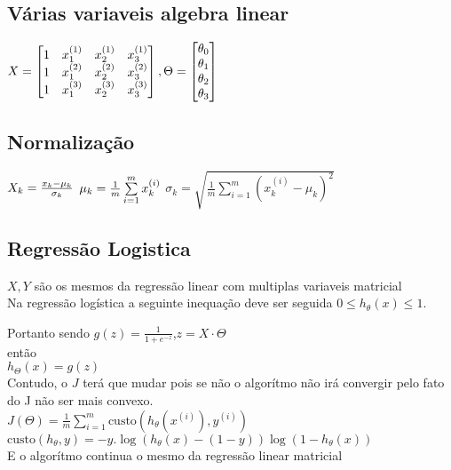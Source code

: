 \documentclass{article}
\begin{document}
	\subsection{Várias variaveis algebra linear}
	$
	X=\begin{bmatrix}
	1 & x^{(1)}_1 & x^{(1)}_2 & x^{(1)}_3 \\
	1 & x^{(2)}_1 & x^{(2)}_2 & x^{(2)}_3 \\
	1 & x^{(3)}_1 & x^{(3)}_2 & x^{(3)}_3 \\
	\end{bmatrix},
	\Theta=\begin{bmatrix}
	\theta_0 \\
	\theta_1 \\
	\theta_2 \\
	\theta_3
	\end{bmatrix}\\
	$

	\subsection{Normalização}
	
	$X_k=\frac{x_k-\mu_k}{\sigma_k}\\$
	$\mu_k=\frac{1}{m}\sum\limits_{i=1}^{m}x_k^{(i)}\\$
	$\sigma_k=\sqrt{\frac{1}{m}\sum\limits_{i=1}^{m}(x_k^{(i)}-\mu_k)^2}$

	\subsection{Regressão Logistica}
	$X,Y$ são os mesmos da regressão linear com multiplas variaveis matricial \\
	Na regressão logística a seguinte inequação deve ser seguida $0 \leq h_\theta(x) \leq 1$.

	Portanto sendo $g(z)=\frac{1}{1+e^{-z}}$,$z=X\cdot\Theta$\\
	então\\
	$h_\Theta(x)=g(z)$ \\
	Contudo, o $J$ terá que mudar pois se não o algorítmo não irá convergir pelo fato do J não 
	ser mais convexo.\\

	$J(\Theta)=\frac{1}{m}\sum\limits_{i=1}^{m}\text{custo}(h_\theta(x^{(i)}),y^{(i)})$ \\
	$\text{custo}(h_{\theta},y)=-y.\log(h_{\theta}(x)-(1-y))\log(1-h_{\theta}(x))$ \\
	E o algorítmo continua o mesmo da regressão linear matricial
\end{document}
